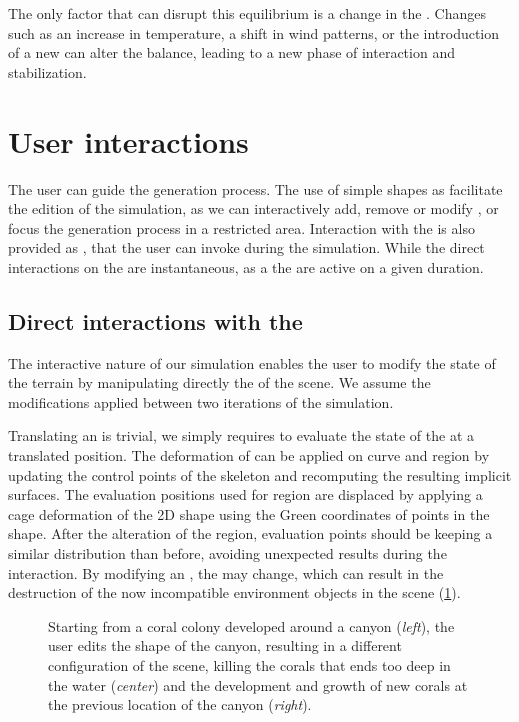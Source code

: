 The only factor that can disrupt this equilibrium is a change in the . Changes such as an increase in temperature, a shift in wind patterns, or the introduction of a new  can alter the balance, leading to a new phase of interaction and stabilization.


\section{User interactions}
\label{sec:env-obj_interaction}
The user can guide the generation process. The use of simple shapes as  facilitate the edition of the simulation, as we can interactively add, remove or modify , or focus the generation process in a restricted area. Interaction with the  is also provided as , that the user can invoke during the simulation. While the direct interactions on the  are instantaneous, as a the  are active on a given duration.

\subsection{Direct interactions with the }
\label{sec:env-obj_manual-interaction}
The interactive nature of our simulation enables the user to modify the state of the terrain by manipulating directly the  of the scene. We assume the modifications applied between two iterations of the simulation.

Translating an  is trivial, we simply requires to evaluate the state of the  at a translated position. The deformation of  can be applied on curve and region  by updating the control points of the skeleton and recomputing the resulting implicit surfaces. The evaluation positions used for region  are displaced by applying a cage deformation of the 2D shape using the Green coordinates of points in the shape. After the alteration of the region, evaluation points should be keeping a similar distribution than before, avoiding unexpected results during the interaction.
By modifying an , the  may change, which can result in the destruction of the now incompatible environment objects in the scene (\cref{fig:env-obj_user-interaction}).

\begin{figure}
    \caption{Starting from a coral colony developed around a canyon (\textit{left}), the user edits the shape of the canyon, resulting in a different configuration of the scene, killing the corals that ends too deep in the water (\textit{center}) and the development and growth of new corals at the previous location of the canyon (\textit{right}). }
    \label{fig:env-obj_user-interaction}
\end{figure}

